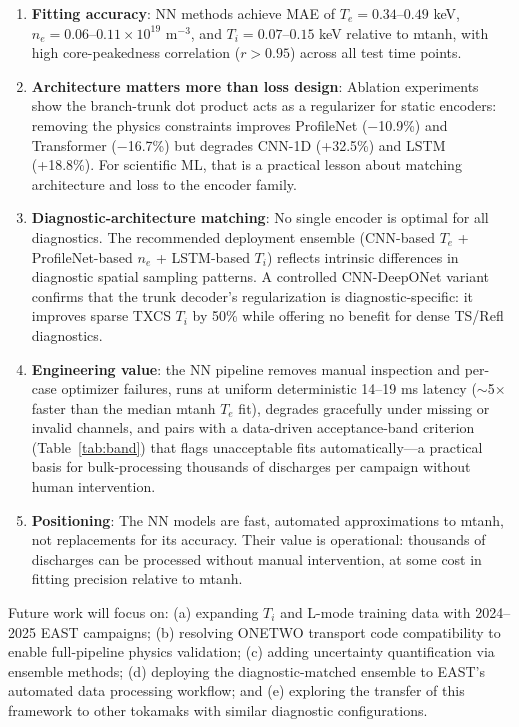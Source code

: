 \documentclass[a4paper,12pt]{article}
\begin{document}
\begin{enumerate}
    \item \textbf{Fitting accuracy}: NN methods achieve MAE of $T_e = 0.34$--$0.49$ keV, $n_e = 0.06$--$0.11 \times 10^{19}$ m$^{-3}$, and $T_i = 0.07$--$0.15$ keV relative to mtanh, with high core-peakedness correlation ($r > 0.95$) across all test time points.

    \item \textbf{Architecture matters more than loss design}: Ablation experiments show the branch-trunk dot product acts as a regularizer for static encoders: removing the physics constraints improves ProfileNet ($-$10.9\%) and Transformer ($-$16.7\%) but degrades CNN-1D (+32.5\%) and LSTM (+18.8\%). For scientific ML, that is a practical lesson about matching architecture and loss to the encoder family.

    \item \textbf{Diagnostic-architecture matching}: No single encoder is optimal for all diagnostics. The recommended deployment ensemble (CNN-based $T_e$ + ProfileNet-based $n_e$ + LSTM-based $T_i$) reflects intrinsic differences in diagnostic spatial sampling patterns. A controlled CNN-DeepONet variant confirms that the trunk decoder's regularization is diagnostic-specific: it improves sparse TXCS $T_i$ by 50\% while offering no benefit for dense TS/Refl diagnostics.

    \item \textbf{Engineering value}: the NN pipeline removes manual inspection and per-case optimizer failures, runs at uniform deterministic 14--19 ms latency ($\sim$5$\times$ faster than the median mtanh $T_e$ fit), degrades gracefully under missing or invalid channels, and pairs with a data-driven acceptance-band criterion (Table~\ref{tab:band}) that flags unacceptable fits automatically---a practical basis for bulk-processing thousands of discharges per campaign without human intervention.

    \item \textbf{Positioning}: The NN models are fast, automated approximations to mtanh, not replacements for its accuracy. Their value is operational: thousands of discharges can be processed without manual intervention, at some cost in fitting precision relative to mtanh.
\end{enumerate}

Future work will focus on: (a) expanding $T_i$ and L-mode training data with 2024--2025 EAST campaigns; (b) resolving ONETWO transport code compatibility to enable full-pipeline physics validation; (c) adding uncertainty quantification via ensemble methods; (d) deploying the diagnostic-matched ensemble to EAST's automated data processing workflow; and (e) exploring the transfer of this framework to other tokamaks with similar diagnostic configurations.
\end{document}
